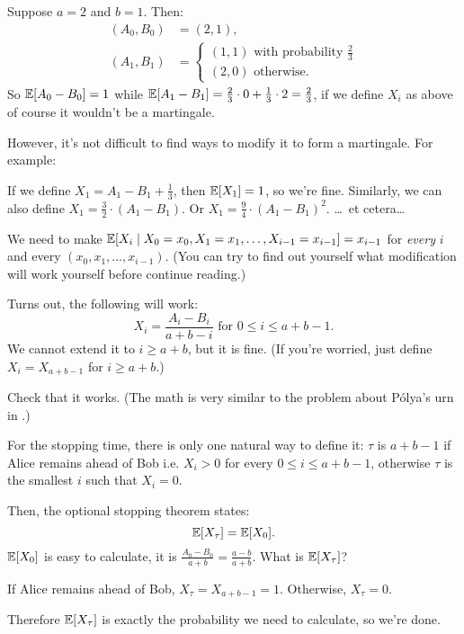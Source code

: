 \begin{example}
	Suppose $a=2$ and $b=1$. Then:
	\begin{align*}
		(A_0, B_0) &= (2, 1), \\
		(A_1, B_1) &= \begin{cases}
			(1, 1)\text{ with probability }\frac{2}{3} \\
			(2, 0)\text{ otherwise.}
		\end{cases}
	\end{align*}
	So $\mathbb E[A_0-B_0]=1$ while $\mathbb E[A_1-B_1]=\frac{2}{3}\cdot 0+\frac{1}{3}\cdot 2=\frac{2}{3}$,
	if we define $X_i$ as above of course it wouldn't be a martingale.

	However, it's not difficult to find ways to modify it to form a martingale. For example:
	\begin{itemize}
		\ii If we define $X_1 = A_1-B_1+\frac{1}{3}$, then $\mathbb E[X_1]=1$, so we're fine.
		\ii Similarly, we can also define $X_1 = \frac{3}{2}\cdot(A_1-B_1)$.
		\ii Or $X_1 = \frac{9}{4}\cdot (A_1-B_1)^2$.
		\ii \dots\ et cetera\dots
	\end{itemize}
\end{example}

We need to make $\mathbb E[X_i \mid X_0=x_0, X_1=x_1, \dots, X_{i-1}=x_{i-1}]=x_{i-1}$
for \emph{every} $i$ and every $(x_0, x_1, \dots, x_{i-1})$. (You can try to find out yourself what
modification will work yourself before continue reading.)

Turns out, the following will work:
\[
	X_i = \frac{A_i-B_i}{a+b-i}\text{ for }0 \leq i \leq a+b-1.
\]
We cannot extend it to $i \geq a+b$, but it is fine.
(If you're worried, just define $X_i = X_{a+b-1}$ for $i \geq a+b$.)
\begin{exercise}
	Check that it works. (The math is very similar to the problem about P\'{o}lya's urn in
	.)
\end{exercise}
For the stopping time, there is only one natural way to define it:
$\tau$ is $a+b-1$ if Alice remains ahead of Bob i.e. $X_i>0$ for every $0 \leq i \leq a+b-1$,
otherwise $\tau$ is the smallest $i$ such that $X_i=0$.

Then, the optional stopping theorem states:
\[ \mathbb E[X_\tau] = \mathbb E[X_0]. \]
$\mathbb E[X_0]$ is easy to calculate, it is $\frac{A_0-B_0}{a+b}=\frac{a-b}{a+b}$.
What is $\mathbb E[X_\tau]$?
\begin{itemize}
	\ii If Alice remains ahead of Bob, $X_\tau = X_{a+b-1} = 1$.
	\ii Otherwise, $X_\tau = 0$.
\end{itemize}
Therefore $\mathbb E[X_\tau]$ is exactly the probability we need to calculate, so we're done.

